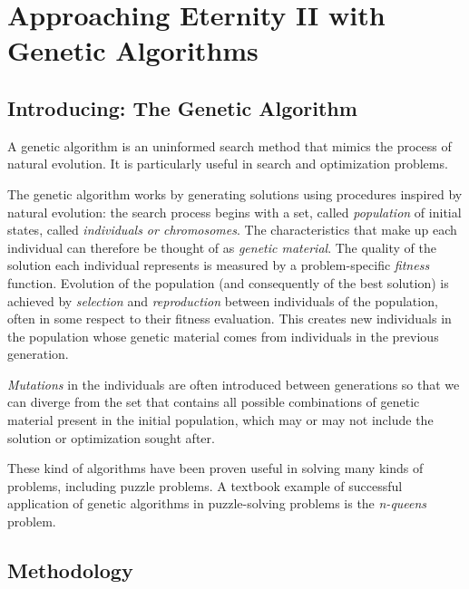 \documentclass{llncs}
\begin{document}
\section{Approaching Eternity II with Genetic Algorithms}\label{sec:genetic_algorithms}

\subsection{Introducing: The Genetic Algorithm}


A genetic algorithm is an uninformed search method that mimics the process of natural evolution. It is particularly useful in search and optimization problems.

The genetic algorithm works by generating solutions using procedures inspired by natural evolution: the search process begins with a set, called \textit{population} of initial states, called \textit{individuals or chromosomes}. The characteristics that make up each individual can therefore be thought of as \textit{genetic material}. The quality of the solution each individual represents is measured by a problem-specific \textit{fitness} function. Evolution of the population (and consequently of the best solution) is achieved by \textit{selection} and \textit{reproduction} between individuals of the population, often in some respect to their fitness evaluation. This creates new individuals in the population whose genetic material comes from individuals in the previous generation.

\textit{Mutations} in the individuals are often introduced between generations so that we can diverge from the set that contains all possible combinations of genetic material present in the initial population, which may or may not include the solution or optimization sought after.

These kind of algorithms have been proven useful in solving many kinds of problems, including puzzle problems. A textbook example of successful application of genetic algorithms in puzzle-solving problems is the \textit{n-queens} problem\cite{eastridge}.

\subsection{Methodology}\label{sec:methodology}
\end{document}
